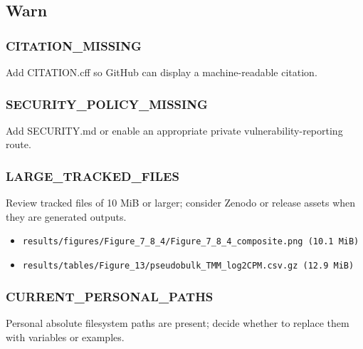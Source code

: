 \documentclass[
]{article}
\providecommand{\tightlist}{%
  \setlength{\itemsep}{0pt}\setlength{\parskip}{0pt}}
\begin{document}
\subsection{Warn}\label{warn}

\subsubsection{CITATION\_MISSING}\label{citation_missing}

Add CITATION.cff so GitHub can display a machine-readable citation.

\subsubsection{SECURITY\_POLICY\_MISSING}\label{security_policy_missing}

Add SECURITY.md or enable an appropriate private vulnerability-reporting
route.

\subsubsection{LARGE\_TRACKED\_FILES}\label{large_tracked_files}

Review tracked files of 10 MiB or larger; consider Zenodo or release
assets when they are generated outputs.

\begin{itemize}
\tightlist
\item
  \texttt{results/figures/Figure\_7\_8\_4/Figure\_7\_8\_4\_composite.png\ (10.1\ MiB)}
\item
  \texttt{results/tables/Figure\_13/pseudobulk\_TMM\_log2CPM.csv.gz\ (12.9\ MiB)}
\end{itemize}

\subsubsection{CURRENT\_PERSONAL\_PATHS}\label{current_personal_paths}

Personal absolute filesystem paths are present; decide whether to
replace them with variables or examples.
\end{document}
